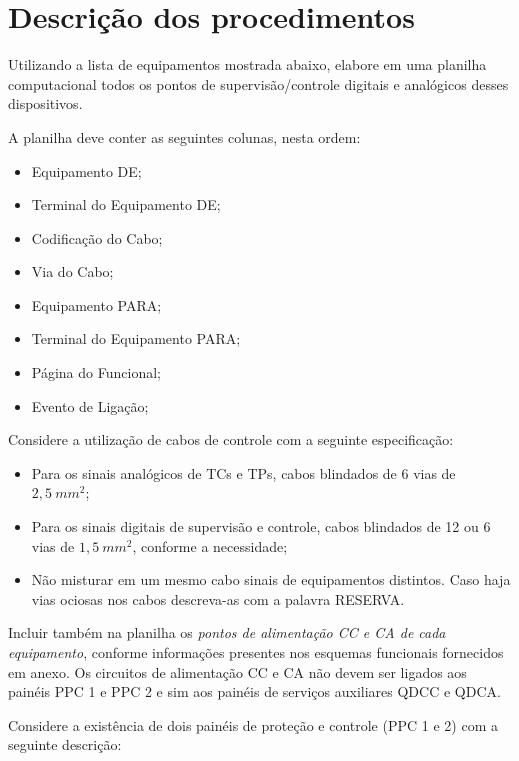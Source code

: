 \hypertarget{descriuxe7uxe3o-dos-procedimentos}{%
\section{Descrição dos
procedimentos}\label{descriuxe7uxe3o-dos-procedimentos}}

Utilizando a lista de equipamentos mostrada abaixo, elabore em uma
planilha computacional todos os pontos de supervisão/controle digitais e
analógicos desses dispositivos.

A planilha deve conter as seguintes colunas, nesta ordem:

\begin{itemize}
\tightlist
\item
  Equipamento DE;
\item
  Terminal do Equipamento DE;
\item
  Codificação do Cabo;
\item
  Via do Cabo;
\item
  Equipamento PARA;
\item
  Terminal do Equipamento PARA;
\item
  Página do Funcional;
\item
  Evento de Ligação;
\end{itemize}

Considere a utilização de cabos de controle com a seguinte
especificação:

\begin{itemize}
\tightlist
\item
  Para os sinais analógicos de TCs e TPs, cabos blindados de 6 vias de
  \(2,5~mm^2\);
\item
  Para os sinais digitais de supervisão e controle, cabos blindados de
  12 ou 6 vias de \(1,5~mm^2\), conforme a necessidade;
\item
  Não misturar em um mesmo cabo sinais de equipamentos distintos. Caso
  haja vias ociosas nos cabos descreva-as com a palavra RESERVA.
\end{itemize}

Incluir também na planilha os \emph{pontos de alimentação CC e CA de
cada equipamento}, conforme informações presentes nos esquemas
funcionais fornecidos em anexo. Os circuitos de alimentação CC e CA não
devem ser ligados aos painéis PPC 1 e PPC 2 e sim aos painéis de
serviços auxiliares QDCC e QDCA.

Considere a existência de dois painéis de proteção e controle (PPC 1 e
2) com a seguinte descrição:

